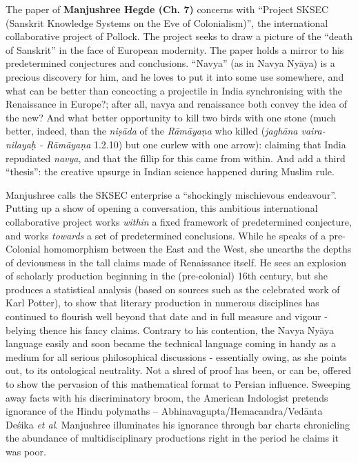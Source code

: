 The paper of {\bf Manjushree Hegde (Ch. 7)} concerns with “Project SKSEC (Sanskrit Knowledge Systems on the Eve of Colonialism)”, the international collaborative project of Pollock. The project seeks to draw a picture of the “death of Sanskrit” in the face of European modernity. The paper holds a mirror to his predetermined conjectures and conclusions. “Navya” (as in Navya Nyāya) is a precious discovery for him, and he loves to put it into some use somewhere, and what can be better than concocting a projectile in India synchronising with the Renaissance in Europe?; after all, navya and renaissance both convey the idea of the new? And what better opportunity to kill two birds with one stone (much better, indeed, than the {\sl niṣāda} of the {\sl Rāmāyaṇa} who killed ({\sl jaghāna vaira-nilayaḥ - Rāmāyaṇa} 1.2.10) but one curlew with one arrow): claiming that India repudiated {\sl navya}, and that the fillip for this came from within. And add a third “thesis”: the creative upsurge in Indian science happened during Muslim rule.

Manjushree calls the SKSEC enterprise a “shockingly mischievous endeavour”. Putting up a show of opening a conversation, this ambitious international collaborative project works {\sl within} a fixed framework of predetermined conjecture, and works {\sl towards} a set of predetermined conclusions. While he speaks of a pre-Colonial homomorphism between the East and the West, she unearths the depths of deviousness in the tall claims made of Renaissance itself. He sees an explosion of scholarly production beginning in the (pre-colonial) 16th century, but she produces a statistical analysis (based on sources such as the celebrated work of Karl Potter), to show that literary production in numerous disciplines has continued to flourish well beyond that date and in full measure and vigour - belying thence his fancy claims. Contrary to his contention, the Navya Nyāya language easily and soon became the technical language coming in handy as a medium for all serious philosophical discussions - essentially owing, as she points out, to its ontological neutrality. Not a shred of proof has been, or can be, offered to show the pervasion of this mathematical format to Persian influence. Sweeping away facts with his discriminatory broom, the American Indologist pretends ignorance of the Hindu polymaths -- Abhinavagupta/Hemacandra/Vedānta Deśika {\sl et al}. Manjushree illuminates his ignorance through bar charts chronicling the abundance of multidisciplinary productions right in the period he claims it was poor.

